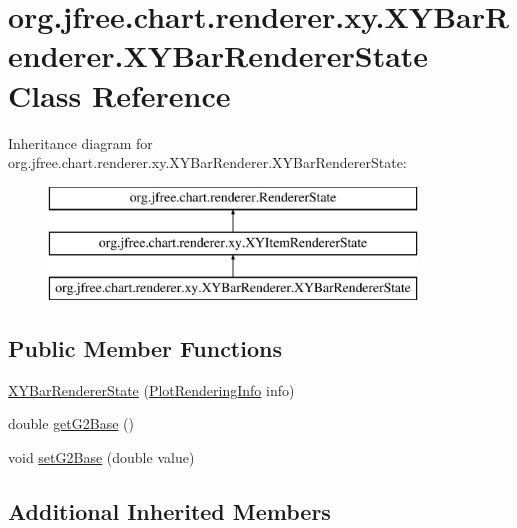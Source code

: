 \hypertarget{classorg_1_1jfree_1_1chart_1_1renderer_1_1xy_1_1_x_y_bar_renderer_1_1_x_y_bar_renderer_state}{}\section{org.\+jfree.\+chart.\+renderer.\+xy.\+X\+Y\+Bar\+Renderer.\+X\+Y\+Bar\+Renderer\+State Class Reference}
\label{classorg_1_1jfree_1_1chart_1_1renderer_1_1xy_1_1_x_y_bar_renderer_1_1_x_y_bar_renderer_state}
Inheritance diagram for org.\+jfree.\+chart.\+renderer.\+xy.\+X\+Y\+Bar\+Renderer.\+X\+Y\+Bar\+Renderer\+State\+:\begin{figure}[H]
\begin{center}
\leavevmode
\includegraphics[height=3.000000cm]{classorg_1_1jfree_1_1chart_1_1renderer_1_1xy_1_1_x_y_bar_renderer_1_1_x_y_bar_renderer_state}
\end{center}
\end{figure}
\subsection*{Public Member Functions}
\begin{DoxyCompactItemize}
\item 
\mbox{\hyperlink{classorg_1_1jfree_1_1chart_1_1renderer_1_1xy_1_1_x_y_bar_renderer_1_1_x_y_bar_renderer_state_a61c28b5f8ab0d3d36c181607f6364a21}{X\+Y\+Bar\+Renderer\+State}} (\mbox{\hyperlink{classorg_1_1jfree_1_1chart_1_1plot_1_1_plot_rendering_info}{Plot\+Rendering\+Info}} info)
\item 
double \mbox{\hyperlink{classorg_1_1jfree_1_1chart_1_1renderer_1_1xy_1_1_x_y_bar_renderer_1_1_x_y_bar_renderer_state_ab5e97c5f111ca009df76c23a8637bc94}{get\+G2\+Base}} ()
\item 
void \mbox{\hyperlink{classorg_1_1jfree_1_1chart_1_1renderer_1_1xy_1_1_x_y_bar_renderer_1_1_x_y_bar_renderer_state_a9a05168db37529b07afe6f0ca4ca1f2e}{set\+G2\+Base}} (double value)
\end{DoxyCompactItemize}
\subsection*{Additional Inherited Members}


